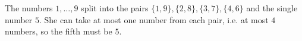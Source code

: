 The numbers $1,\dots,9$ split into the pairs $\{1,9\},\{2,8\},\{3,7\},\{4,6\}$ and the single number $5$. She can take at most one number from each pair, i.e. at most $4$ numbers, so the fifth must be $\boxed{5}$.
